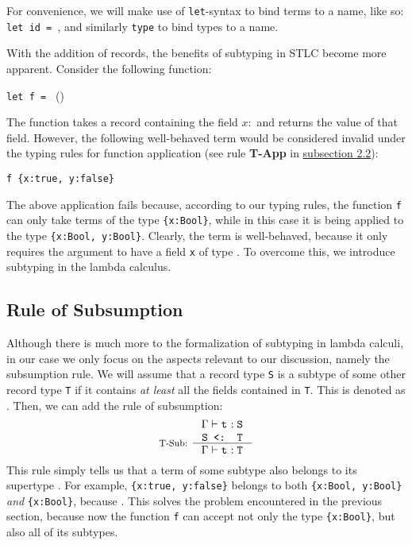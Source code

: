 For convenience, we will make use of \texttt{let}-syntax to bind terms to a name, like so: \texttt{let id = }, and similarly \texttt{type} to bind types to a name.

With the addition of records, the benefits of subtyping in STLC become more apparent. Consider the following function:
\begin{center}
\texttt{let f = } ()
\end{center}
The function  takes a record containing the field $x:$ \Boolt{} and returns the value of that field. However, the following well-behaved term would be considered invalid under the typing rules for function application (see rule \textbf{T-App} in \hyperref[sec:STLC]{subsection 2.2}):
\begin{center}
\texttt{f \{x:true, y:false\}}
\end{center}

The above application fails because, according to our typing rules, the function \texttt{f} can only take terms of the type \texttt{\{x:Bool\}}, while in this case it is being applied to the type \texttt{\{x:Bool, y:Bool\}}. Clearly, the term is well-behaved, because it only requires the argument to have a field \texttt{x} of type \Boolt{}. To overcome this, we introduce subtyping in the lambda calculus.

\subsection{Rule of Subsumption}

Although there is much more to the formalization of subtyping in lambda calculi, in our case we only focus on the aspects relevant to our discussion, namely the subsumption rule. We will assume that a record type \texttt{S} is a subtype of some other record type \texttt{T} if it contains \textit{at least} all the fields contained in \texttt{T}. This is denoted as . Then, we can add the rule of subsumption:
\begin{align*}
\inference[T-Sub: ]{
  \Gamma \vdash \tm{t}{} : \tm{S}{} \\
  \subt{S}{T}
}{\Gamma \vdash \tm{t}{} : \tm{T}{}}
\end{align*}
This rule simply tells us that a term of some subtype  also belongs to its supertype . For example, \texttt{\{x:true, y:false\}} belongs to both \texttt{\{x:Bool, y:Bool\}} \textit{and} \texttt{\{x:Bool\}}, because . This solves the problem encountered in the previous section, because now the function \texttt{f} can accept not only the type \texttt{\{x:Bool\}}, but also all of its subtypes.


